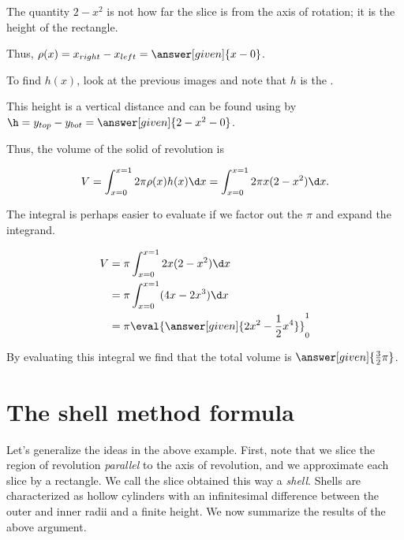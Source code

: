 \documentclass{ximera}
\begin{document}
\begin{model}
\begin{feedback}
\begin{image}
            \end{image}     

The quantity $2-x^2$ is not how far the slice is from the axis of rotation; it is the height of the rectangle.

 \end{feedback}

Thus, $\rho(x) = x_{right}-x_{left} = \answer[given]{x-0}$.

To find $h(x)$, look at the previous images and note that $h$ is the .

This height is a vertical distance and can be found using by $\h = y_{top}-y_{bot} = \answer[given]{2-x^2-0}$.


Thus, the volume of the solid of revolution is

\[
V = \int_{x=0}^{x=1} 2 \pi \rho(x) h(x) \d x = \int_{x=0}^{x=1} 2 \pi x(2-x^2) \d x.
\]

The integral is perhaps easier to evaluate if we factor out the $\pi$ and expand the integrand.

\begin{align*}
V &= \pi \int_{x=0}^{x=1} 2x(2-x^2) \d x \\
&= \pi \int_{x=0}^{x=1} (4x-2x^3) \d x \\
&= \pi \eval{\answer[given]{2x^2-\frac{1}{2}x^4}}_0^1
\end{align*}

By evaluating this integral we find that the total volume is $\answer[given]{\frac{3}{2}\pi}$.   
\end{model}

\section{The shell method formula}
Let's generalize the ideas in the above example.  First, note that we slice the region of revolution \emph{parallel} to the axis of revolution, and we approximate each slice by a rectangle.  We call the slice obtained this way a \emph{shell}.  Shells are characterized as hollow cylinders with an infinitesimal difference between the outer and inner radii and a finite height.  We now summarize the results of the above argument.
\end{document}
